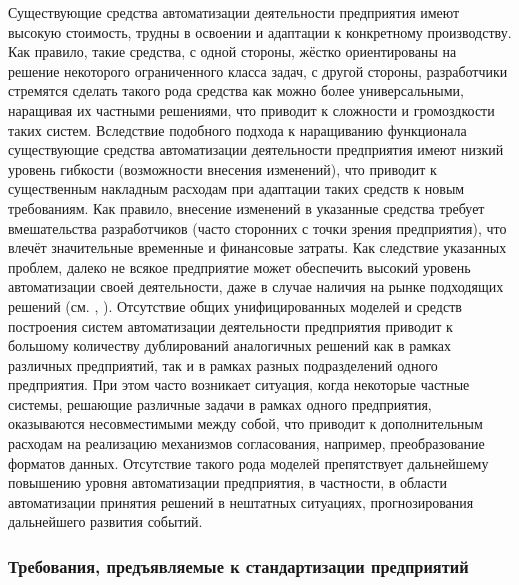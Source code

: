 Существующие средства автоматизации деятельности предприятия имеют высокую стоимость, трудны в освоении и адаптации к конкретному производству. Как правило, такие средства, с одной стороны, жёстко ориентированы на решение некоторого ограниченного класса задач, с другой стороны, разработчики стремятся сделать такого рода средства как можно более универсальными, наращивая их частными решениями, что приводит к сложности и громоздкости таких систем. Вследствие подобного подхода к наращиванию функционала существующие средства автоматизации деятельности предприятия имеют низкий уровень гибкости (возможности внесения изменений), что приводит к существенным накладным расходам при адаптации таких средств к новым требованиям. Как правило, внесение изменений в указанные средства требует вмешательства разработчиков (часто сторонних с точки зрения предприятия), что влечёт значительные временные и финансовые затраты. Как следствие указанных проблем, далеко не всякое предприятие может обеспечить высокий уровень автоматизации своей деятельности, даже в случае наличия на рынке подходящих решений (см. , ).
Отсутствие общих унифицированных моделей и средств построения систем автоматизации деятельности предприятия приводит к большому количеству дублирований аналогичных решений как в рамках различных предприятий, так и в рамках разных подразделений одного предприятия. При этом часто возникает ситуация, когда некоторые частные системы, решающие различные задачи в рамках одного предприятия, оказываются несовместимыми между собой, что приводит к дополнительным расходам на реализацию механизмов согласования, например, преобразование форматов данных. Отсутствие такого рода моделей препятствует дальнейшему повышению уровня автоматизации предприятия, в частности, в области автоматизации принятия решений в нештатных ситуациях, прогнозирования дальнейшего развития событий.

\subsubsection{Требования, предъявляемые к стандартизации предприятий}

